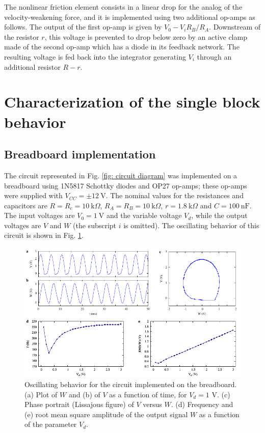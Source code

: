 The nonlinear friction element consists in a linear drop for the analog of the velocity-weakening force, and it is
implemented using two additional op-amps as follows. The output of the first op-amp is given by $V_0-V_iR_B/R_A$.
Downstream of the resistor $r$, this voltage is prevented to drop below zero by an active
clamp made of the second op-amp which has a diode in its feedback network. The resulting voltage is fed back into
the integrator generating $V_i$ through an additional resistor $R-r$.


\section{Characterization of the single block behavior}
\label{sec: single block characterization}

\subsection{Breadboard implementation}
\label{subsec:breadboard implementation}

The circuit represented in Fig. \ref{fig: circuit diagram} was implemented on a breadboard using 1N5817 Schottky diodes
and OP27 op-amps; these op-amps were
supplied with $V_{CC}=\pm12~\text{V}$. The nominal values for the
resistances and capacitors are $R=R_c=10~\text{k}\Omega$,
$R_A=R_B=10~\text{k}\Omega$, $r=1.8~\text{k}\Omega$ and
$C=100~\text{nF}$. The input voltages are $V_0=1~\text{V}$ and
the variable voltage $V_d$, while the output voltages are
$V$ and $W$ (the subscript $i$ is omitted).
The oscillating behavior of this circuit is shown in Fig. \ref{fig:oscillation breadboard}.

\begin{figure}[H]
    \centering
    \includegraphics[width=\linewidth]{../1_block/breadboard/single_block.pdf}
    \caption{Oscillating behavior for the circuit implemented on
    the breadboard. (a) Plot of $W$ and (b) of $V$ as a function of time,
    for $V_d=1$ V.
    (c) Phase portrait (Lissajous figure) of $V$ versus $W$. (d)
    Frequency and (e) root mean square amplitude of the
    output signal $W$ as a function of the parameter $V_d$.}
    \label{fig:oscillation breadboard}
\end{figure}

